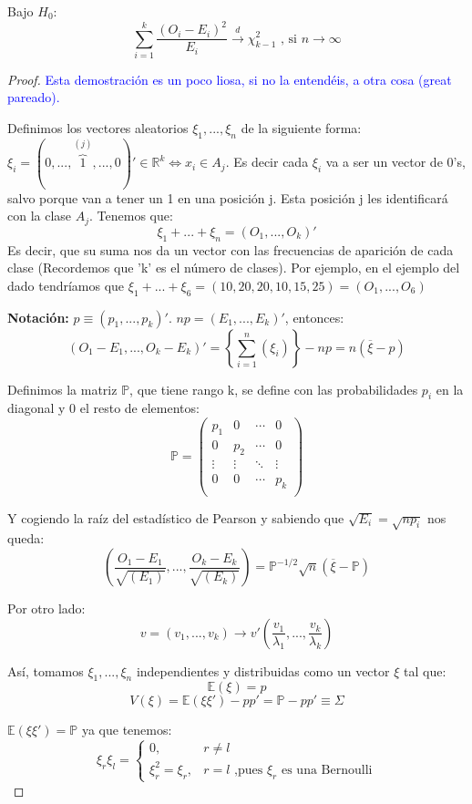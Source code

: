 \documentclass[nochap]{apuntes}
\begin{document}
\begin{theorem}
Bajo $H_0$:
\[
\sum_{i=1}^k \frac{(O_i-E_i)^2}{E_i} \stackrel{d}{\rightarrow} \chi^2_{k-1} \text{ , si } n \rightarrow \infty
\]
\end{theorem}
\begin{proof}
\textcolor{blue}{Esta demostración es un poco liosa, si no la entendéis, a otra cosa (great pareado).}

Definimos los vectores aleatorios $\xi_1,...,\xi_n$ de la siguiente forma: $\xi_i=(0,...,\overbrace{1}^{(j)},...,0)' \in \mathbb{R}^k \Leftrightarrow x_i \in A_j$. Es decir cada $\xi_i$ va a ser un vector de 0's, salvo porque van a tener un 1 en una posición j. Esta posición j les identificará con la clase $A_j$. Tenemos que:
\[
\xi_1+...+\xi_n=(O_1,...,O_k)'
\]
Es decir, que su suma nos da un vector con las frecuencias de aparición de cada clase (Recordemos que 'k' es el número de clases). Por ejemplo, en el ejemplo del dado tendríamos que $\xi_1+...+\xi_6=(10,20,20,10,15,25)=(O_1,...,O_6)$

\textbf{Notación: } $p\equiv (p_1,...,p_k)'$. $np=(E_1,...,E_k)'$, entonces:
\[
(O_1-E_1,...,O_k-E_k)'=\left\{\sum_{i=1}^n(\xi_i)\right\}-np=n(\overline{\xi}-p)
\]

Definimos la matriz $\mathbb{P}$, que tiene rango k, se define con las probabilidades $p_i$ en la diagonal y 0 el resto de elementos:
\[
\mathbb{P}=\left(
\begin{array}{cccc}
p_1    & 0      & \cdots & 0 \\
0      & p_2    & \cdots & 0 \\
\vdots & \vdots & \ddots & \vdots \\
0      & 0      & \cdots & p_k \\
\end{array}
\right)
\]

Y cogiendo la raíz del estadístico de Pearson y sabiendo que $\sqrt{E_i}=\sqrt{np_i}$ nos queda:
\[
\left(\frac{O_1-E_1}{\sqrt{(E_1)}},...,\frac{O_k-E_k}{\sqrt{(E_k)}}  \right) = \mathbb{P}^{-1/2}\sqrt{n} (\overline{\xi}-\mathbb{P})
\]

Por otro lado: 
\[
v=(v_1,...,v_k) \rightarrow v'(\frac{v_1}{\lambda_1},...,\frac{v_k}{\lambda_k})
\]

Así, tomamos $\xi_1,...,\xi_n$ independientes y distribuidas como un vector $\xi$ tal que:
\[
\mathbb{E}(\xi)=p
\]
\[
V(\xi)=\mathbb{E}(\xi \xi') -pp' = \mathbb{P}-pp' \equiv \Sigma 
\]

$\mathbb{E}(\xi\xi')=\mathbb{P}$ ya que tenemos:
\[	ξ_r ξ_l =
	\begin{cases}
		0, & r≠l \\
		ξ_r^2 = ξ_r, & r=l \text{ ,pues } ξ_r \text{ es una Bernoulli}
	\end{cases}
\]


\end{proof}
\end{document}

